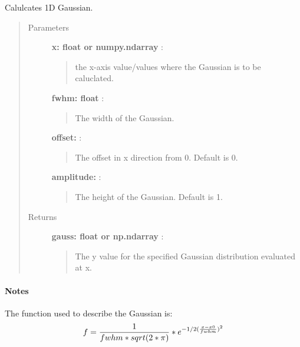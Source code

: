 \documentclass[a4paper,10pt,english]{sphinxmanual}
\begin{document}
\begin{fulllineitems}
\label{functions:astrolyze.functions.astro_functions.gauss1D}
Calulcates 1D Gaussian.
\begin{quote}\begin{description}
\item[{Parameters }] \leavevmode
\textbf{x: float or numpy.ndarray} :
\begin{quote}

the x-axis value/values where the Gaussian is to be caluclated.
\end{quote}

\textbf{fwhm: float} :
\begin{quote}

The width of the Gaussian.
\end{quote}

\textbf{offset:} :
\begin{quote}

The offset in x direction from 0. Default is 0.
\end{quote}

\textbf{amplitude:} :
\begin{quote}

The height of the Gaussian. Default is 1.
\end{quote}

\item[{Returns }] \leavevmode
\textbf{gauss: float or np.ndarray} :
\begin{quote}

The y value for the specified Gaussian distribution evaluated at x.
\end{quote}

\end{description}\end{quote}
\paragraph{Notes}

The function used to describe the Gaussian is:
\begin{gather}
\begin{split}f = \frac{1}{fwhm * sqrt(2 * \pi)} * e^{-1/2 (\frac{x-x0}{fwhm})^2}\end{split}\notag
\end{gather}
\end{fulllineitems}
\end{document}
